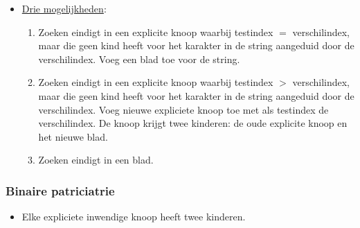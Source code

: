\documentclass{report}
\begin{document}
\begin{itemize}
\begin{itemize}
			\item \underline{Drie mogelijkheden}:
			\begin{enumerate}
				\item Zoeken eindigt in een explicite knoop waarbij testindex $=$ verschilindex, maar die geen kind heeft voor het karakter in de string aangeduid door de verschilindex. Voeg een blad toe voor de string.
				\item Zoeken eindigt in een explicite knoop waarbij testindex $>$ verschilindex, maar die geen kind heeft voor het karakter in de string aangeduid door de verschilindex. Voeg nieuwe expliciete knoop toe met als testindex de verschilindex. De knoop krijgt twee kinderen: de oude explicite knoop en het nieuwe blad.
				\item Zoeken eindigt in een blad.
			\end{enumerate}
		\end{itemize}
\end{itemize}
\subsubsection{Binaire patriciatrie}
\begin{itemize}
	\item[\info] Elke expliciete inwendige knoop heeft twee kinderen.
\end{itemize}
\end{document}
